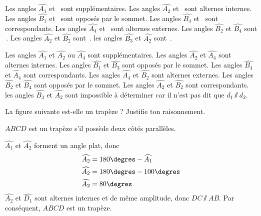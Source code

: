 \documentclass[a4paper,fontsize=12pt, parskip=half]{scrartcl}
\begin{document}
\begin{exercise}
    \parbox{.3\linewidth}{}
    \parbox{.7\linewidth}{%
        \begin{tasks}
            \task Les angles $\widehat{A_1}$ et \dotfill\ sont supplémentaires.
            \task Les angles $\widehat{A_2}$ et \dotfill\ sont alternes internes.
            \task Les angles $\widehat{B_1}$ et \dotfill\ sont opposés par le sommet.
            \task Les angles $\widehat{B_4}$ et \dotfill\ sont correspondants.
            \task Les angles $\widehat{A_4}$ et \dotfill\ sont alternes externes.
            \task Les angles $\widehat{B_2}$ et $\widehat{B_4}$ sont \dotfill\,.
            \task Les angles $\widehat{A_2}$ et $\widehat{B_2}$ sont \dotfill\,.
            \task les angles $\widehat{B_3}$ et $\widehat{A_2}$ sont \dotfill\,.
        \end{tasks}}
\end{exercise}
\begin{solution}
    \begin{tasks}
        \task Les angles $\widehat{A_1}$ et $\widehat{A_2}$ ou $\widehat{A_4}$
        sont supplémentaires.
        \task Les angles $\widehat{A_2}$ et $\widehat{A_4}$ sont
        alternes internes.
        \task Les angles $\widehat{B_1}$ et $\widehat{B_3}$ sont opposés par
        le sommet.
        \task Les angles $\widehat{B_4}$ et $\widehat{A_4}$ sont correspondants.
        \task Les angles $\widehat{A_4}$ et $\widehat{B_2}$ sont
        alternes externes.
        \task Les angles $\widehat{B_2}$ et $\widehat{B_4}$ sont
        opposés par le sommet.
        \task Les angles $\widehat{A_2}$ et $\widehat{B_2}$ sont
        correspondants.
        \task les angles $\widehat{B_3}$ et $\widehat{A_2}$ sont impossible
        à déterminer car il n'est pas dit que $d_1\sslash d_2$.
    \end{tasks}
\end{solution}

\begin{exercise}
    La figure suivante est-elle un trapèze ? Justifie ton raisonnement.
    \begin{center}
        
    \end{center}
\end{exercise}
\begin{solution}
    $ABCD$ est un trapèze s'il possède deux côtés parallèles.

    $\widehat{A_1}$ et $\widehat{A_2}$ forment un angle plat, donc
    \begin{align*}
        \widehat{A_2} & = 180\degres - \widehat{A_1} \\
        \widehat{A_2} & = 180\degres - 100\degres    \\
        \widehat{A_2} & = 80\degres                  \\
    \end{align*}
    $\widehat{A_2}$ et $\widehat{D_1}$ sont alternes internes et de même
    amplitude, donc $DC\sslash AB$. Par conséquent, $ABCD$ est un trapèze.
\end{solution}
\end{document}
